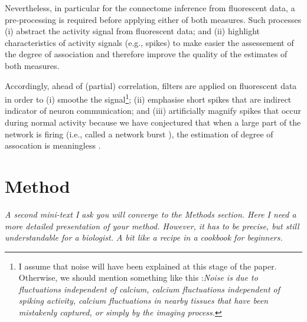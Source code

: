 \documentclass[wcp]{jmlr}
\begin{document}
Nevertheless, in particular for the connectome inference from fluorescent
data, a pre-processing is required before applying either of both measures.
Such processes (i) abstract the activity signal from fluorescent data; and
(ii) highlight characteristics of activity signals (e.g., spikes) to make
easier the assessement of the degree of association and therefore improve the
quality of the estimates of both measures.

Accordingly, ahead of (partial) correlation, filters are applied on fluorescent data in order to (i) smoothe the signal\footnote{I assume that noise will have been explained at this stage of the paper. Otherwise, we should mention something like this :\textit{Noise is due to fluctuations independent of calcium, calcium fluctuations independent of spiking activity, calcium fluctuations in nearby tissues that have been mistakenly captured, or simply by the imaging process.}}; (ii) emphasise short spikes that are indirect indicator of neuron communication; and (iii) artificially magnify spikes that occur during normal activity because we have conjectured that when a large part of the network is firing (i.e., called a network burst \citep{stetter2012model}), the estimation of degree of assocation is meaningless \citep{sutera2014simple}.



\section{Method}
\emph{A second mini-text I ask you will converge to the Methods section. Here I need
a more detailed presentation of your method. However, it has to be precise, but
still understandable for a biologist. A bit like a recipe in a cookbook for
beginners.}


\newpage

\end{document}

